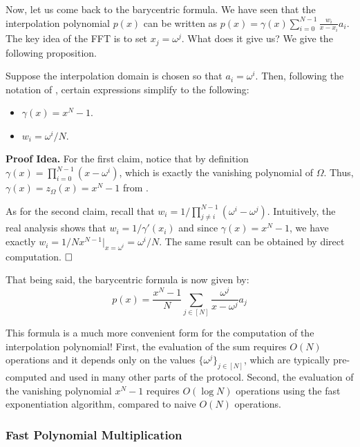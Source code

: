 \documentclass[../lecture-notes.tex]{subfiles}
\begin{document}
Now, let us come back to the barycentric formula. We have seen that the
interpolation polynomial $p(x)$ can be written as $p(x) = \gamma(x) 
\sum_{i=0}^{N-1} \frac{w_i}{x-x_i}a_i$. The key idea of the FFT is to
set $x_j = \omega^j$. What does it give us? We give the following proposition.

\begin{proposition}
    Suppose the interpolation domain is chosen so that $a_i = \omega^i$. Then, 
    following the notation of , certain expressions 
    simplify to the following:
    \begin{itemize}
        \item $\gamma(x) = x^N-1$.
        \item $w_i = \omega^i/N$.
    \end{itemize}
\end{proposition}

\textbf{Proof Idea.} For the first claim, notice that
by definition $\gamma(x) = \prod_{i=0}^{N-1}(x-\omega^i)$, which is exactly 
the vanishing polynomial of $\Omega$. Thus, $\gamma(x) = z_{\Omega}(x) = x^N-1$
from . 

As for the second claim, recall that $w_i = 1/\prod_{j \neq
i}^{N-1}(\omega^i-\omega^j)$. Intuitively, the real analysis
shows that $w_i = 1/\gamma'(x_i)$ and since $\gamma(x)=x^N-1$, we 
have exactly $w_i = 1/Nx^{N-1}\Big|_{x=\omega^i}=\omega^i/N$. The same 
result can be obtained by direct computation. $\hfill\Box$

That being said, the barycentric formula is now given by:
\begin{equation*}
    p(x) = \frac{x^N-1}{N} \sum_{j \in [N]} \frac{\omega^j}{x-\omega^j}a_j
\end{equation*}

This formula is a much more convenient form for the computation of the
interpolation polynomial! First, the evaluation of the sum requires $O(N)$
operations and it depends only on the values $\{\omega^j\}_{j \in [N]}$,
which are typically pre-computed and used in many other parts of the protocol.
Second, the evaluation of the vanishing polynomial $x^N-1$ requires $O(\log N)$
operations using the fast exponentiation algorithm, compared to naive 
$O(N)$ operations. 

\subsubsection{Fast Polynomial Multiplication}
\end{document}
